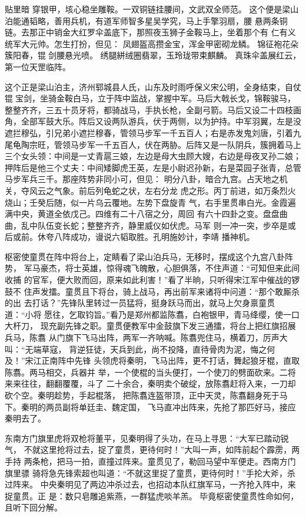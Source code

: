 贴里暗
穿银甲，垓心稳坐雕鞍。一双铜链挂腰间，文武双全师范。
这个便是梁山泊能通韬略，善用兵机，有道军师智多星吴学究，马上手擎羽扇，腰
悬两条铜链。去那正中销金大红罗伞盖底下，那照夜玉狮子金鞍马上，坐着那个有
仁有义统军大元帅。怎生打扮，但见：
凤翅盔高攒金宝，浑金甲密砌龙鳞。
锦征袍花朵簇阳春，锟剑腰悬光喷。
绣腿絣绒圈翡翠，玉玲珑带束麒麟。
真珠伞盖展红云，第一位天罡临阵。

这个正是梁山泊主，济州郓城县人氏，山东及时雨呼保义宋公明，全身结束，自仗
锟宝剑，坐骑金鞍白马，立于阵中监战，掌握中军。马后大戟长戈，锦鞍骏马，
整整齐齐，三五十员牙将，都骑战马，手执长枪，全副弓箭。马后又设二十四枝画
角，全部军鼓大乐。阵后又设两队游兵，伏于两侧，以为护持。中军羽翼，左是没
遮拦穆弘，引兄弟小遮拦穆春，管领马步军一千五百人；右是赤发鬼刘唐，引着九
尾龟陶宗旺，管领马步军一千五百人，伏在两胁。后阵又是一队阴兵，簇拥着马上
三个女头领：中间是一丈青扈三娘，左边是母大虫顾大嫂，右边是母夜叉孙二娘；
押阵后是他三个丈夫：中间矮脚虎王英，左是小尉迟孙新，右是菜园子张青，总管
马步军兵三千。那座阵势非同小可，但见：
明分八卦，暗合九宫。占天地之机关，夺风云之气象。前后列龟蛇之状，左右分龙
虎之形。丙丁前进，如万条烈火烧山；壬癸后随，似一片乌云覆地。左势下盘旋青
气，右手里贯串白光。金霞遍满中央，黄道全依戊己。四维有二十八宿之分，周回
有六十四卦之变。盘盘曲曲，乱中队伍变长蛇；整整齐齐，静里威仪如伏虎。马军
则一冲一突，步卒是或后或前。休夸八阵成功，谩说六韬取胜。孔明施妙计，李靖
播神机。

枢密使童贯在阵中将台上，定睛看了梁山泊兵马，无移时，摆成这个九宫八卦阵势，
军马豪杰，将士英雄，惊得魂飞魄散，心胆俱落，不住声道：“可知但来此间收捕
的官军，便大败而回，原来如此利害！”看了半晌，只听得宋江军中催战的锣鼓不
住声发擂。童贯且下将台，骑上战马，再出前军来诸将中问道：“那个敢厮杀的出
去打话？”先锋队里转过一员猛将，挺身跃马而出，就马上欠身禀童贯道：“小将
愿往，乞取钧旨。”看乃是郑州都监陈翥，白袍银甲，青马绛缨，使一口大杆刀，
现充副先锋之职。童贯便教军中金鼓旗下发三通擂，将台上把红旗招展兵马，陈翥
从门旗下飞马出阵，两军一齐呐喊。陈翥兜住马，横着刀，厉声大叫：“无端草寇，
背逆狂徒，天兵到此，尚不投降，直待骨肉为泥，悔之何及！”宋江正南阵中先锋
头领虎将秦明，飞马出阵，更不打话，舞起狼牙棍，直取陈翥。两马相交，兵器并
举，一个使棍的当头便打，一个使刀的劈面砍来。二将来来往往，翻翻覆覆，斗了
二十余合，秦明卖个破绽，放陈翥赶将入来，一刀却砍个空。秦明趁势，手起棍落，
把陈翥连盔带顶，正中天灵，陈翥翻身死于马下。秦明的两员副将单廷圭、魏定国，
飞马直冲出阵来，先抢了那匹好马，接应秦明去了。

东南方门旗里虎将双枪将董平，见秦明得了头功，在马上寻思：“大军已踏动锐气，
不就这里抢将过去，捉了童贯，更待何时！”大叫一声，如阵前起个霹雳，两手持
两条枪，把马一拍，直撞过阵来。童贯见了，勒回马望中军便走。西南方门旗里骠
骑将急先锋索超也叫道：“不就这里捉了童贯，更待何时！”手抡大斧，杀过阵来。
中央秦明见了两边冲杀过去，也招动本队红旗军马，一齐抢入阵中，来捉童贯。正
是：数只皂雕追紫燕，一群猛虎啖羊羔。
毕竟枢密使童贯性命如何，且听下回分解。